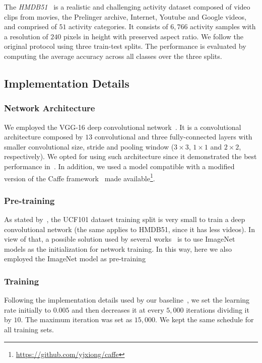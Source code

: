 \documentclass[10pt,conference]{IEEEtran}
\begin{document}
The \emph{HMDB51}~\cite{Kuehne:2011} is a realistic and challenging activity dataset composed of video clips from movies, the Prelinger archive, Internet, Youtube and Google videos, and comprised of $51$ activity categories. It consists of $6,766$ activity samples with a resolution of $240$ pixels in height with preserved aspect ratio. We follow the original protocol using three train-test splits. The performance is evaluated by computing the average accuracy across all classes over the three splits.


\subsection{Implementation Details}

\subsubsection{Network Architecture}

We employed the VGG-16 deep convolutional network~\cite{Simonyan:2014b}. It is a convolutional architecture composed by $13$ convolutional and three fully-connected layers with smaller convolutional size, stride and pooling window ($3 \times 3$, $1 \times 1$ and $2 \times 2$, respectively). We opted for using such architecture since it demonstrated the best performance in~\cite{Wang:2015}. In addition, we used a model compatible with a modified version of the Caffe framework~\cite{Jia:2014} made available\footnote{\url{https://github.com/yjxiong/caffe}}.

\subsubsection{Pre-training}

As stated by~\cite{Wang:2015}, the UCF101 dataset training split is very small to train a deep convolutional network (the same applies to HMDB51, since it has less videos). In view of that, a possible solution used by several works~\cite{Simonyan:2014, Wang:2015, Feichtenhofer:2016, Wang:2016} is to use
ImageNet models as the initialization for network training. In this way, here we also employed the ImageNet model as pre-training

\subsubsection{Training} 

Following the implementation details used by our baseline~\cite{Wang:2015}, we set the learning rate initially to $0.005$ and then decreases it at every $5,000$ iterations dividing it by $10$. The maximum iteration was set as $15,000$.
We kept the same schedule for all training sets. %
\end{document}
